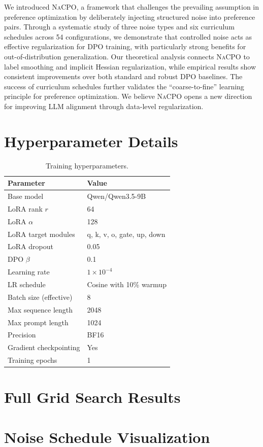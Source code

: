 \documentclass{article}
\newcommand{\nacpo}{\textsc{NaCPO}}
\begin{document}
We introduced \nacpo{}, a framework that challenges the prevailing assumption in preference optimization by deliberately injecting structured noise into preference pairs.
Through a systematic study of three noise types and six curriculum schedules across 54 configurations, we demonstrate that controlled noise acts as effective regularization for DPO training, with particularly strong benefits for out-of-distribution generalization.
Our theoretical analysis connects \nacpo{} to label smoothing and implicit Hessian regularization, while empirical results show consistent improvements over both standard and robust DPO baselines.
The success of curriculum schedules further validates the ``coarse-to-fine'' learning principle for preference optimization.
We believe \nacpo{} opens a new direction for improving LLM alignment through data-level regularization.






\appendix
\section{Hyperparameter Details}
\label{app:hyperparams}

\begin{table}[h]
\centering
\caption{Training hyperparameters.}
\small
\begin{tabular}{@{}ll@{}}
\toprule
\textbf{Parameter} & \textbf{Value} \\
\midrule
Base model & Qwen/Qwen3.5-9B \\
LoRA rank $r$ & 64 \\
LoRA $\alpha$ & 128 \\
LoRA target modules & q, k, v, o, gate, up, down \\
LoRA dropout & 0.05 \\
DPO $\beta$ & 0.1 \\
Learning rate & $1 \times 10^{-4}$ \\
LR schedule & Cosine with 10\% warmup \\
Batch size (effective) & 8 \\
Max sequence length & 2048 \\
Max prompt length & 1024 \\
Precision & BF16 \\
Gradient checkpointing & Yes \\
Training epochs & 1 \\
\bottomrule
\end{tabular}
\end{table}


\section{Full Grid Search Results}
\label{app:full_grid}



\section{Noise Schedule Visualization}
\label{app:schedules}

\end{document}
